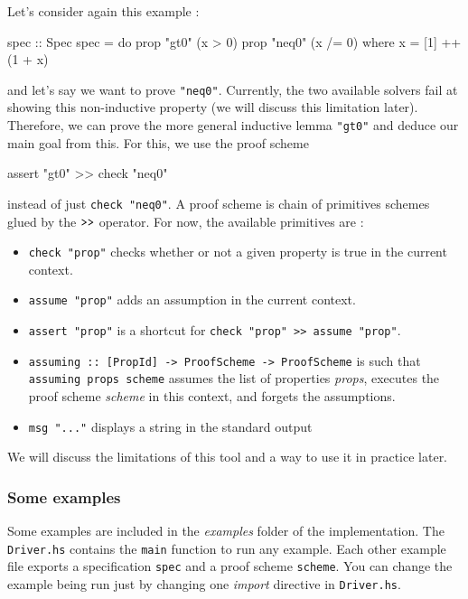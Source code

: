Let's consider again this example :

\begin{code}
spec :: Spec
spec = do
  prop "gt0"  (x > 0)
  prop "neq0" (x /= 0)
  where
    x = [1] ++ (1 + x)

\end{code}
and let's say we want to prove \texttt{"neq0"}. Currently, the two
available solvers fail at showing this non-inductive property (we will
discuss this limitation later). Therefore, we can prove the more general
inductive lemma \texttt{"gt0"} and deduce our main goal from this. For
this, we use the proof scheme

\begin{code}
assert "gt0" >> check "neq0"
\end{code}


instead of just \texttt{check "neq0"}. A proof scheme is chain of
primitives schemes glued by the $\texttt{\textgreater{}\textgreater{}}$
operator. For now, the available primitives are :

\begin{itemize}
\itemsep1pt\parskip0pt
\item
  \texttt{check "prop"} checks whether or not a given property is true
  in the current context.
\item
  \texttt{assume "prop"} adds an assumption in the current context.
\item
  \texttt{assert "prop"} is a shortcut for
  \texttt{check "prop" \textgreater{}\textgreater{} assume "prop"}.
\item
  \texttt{assuming :: {[}PropId{]} -\textgreater{} ProofScheme -\textgreater{} ProofScheme}
  is such that \texttt{assuming props scheme} assumes the list of
  properties \emph{props}, executes the proof scheme \emph{scheme} in
  this context, and forgets the assumptions.
\item
  \texttt{msg "..."} displays a string in the standard output
\end{itemize}

We will discuss the limitations of this tool and a way to use it in
practice later.

\subsubsection{Some examples}\label{some-examples}


Some examples are included in the \emph{examples} folder of the implementation. The \texttt{Driver.hs}
contains the \texttt{main} function to run any example. Each other
example file exports a specification \texttt{spec} and a proof scheme
\texttt{scheme}. You can change the example being run just by changing
one \emph{import} directive in \texttt{Driver.hs}.


